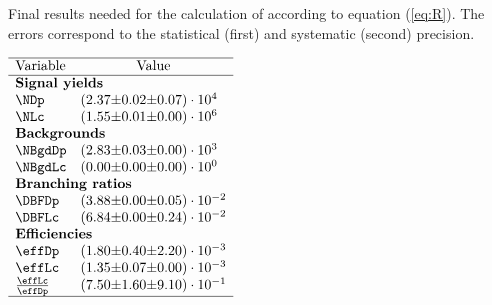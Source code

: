  
\begin{table}[h]
    \centering
    \caption{Final results needed for the calculation of \R according to equation (\ref{eq:R}). The errors correspond to the statistical (first) and systematic (second) precision.}
    \label{tab:table_finalresults.tex}
    $\begin{array}{lr@{\pm}r@{\pm}l}
    \hline
    \text{Variable} & \multicolumn{3}{c}{\text{Value}} \\
    \hline
\multicolumn{4}{l}{\text{\textbf{Signal yields}}} \\
\NDp&(2.37 & 0.02 & 0.07) \cdot 10^{4}\\
\NLc&(1.55 & 0.01 & 0.00) \cdot 10^{6}\\
\multicolumn{4}{l}{\text{\textbf{Backgrounds}}} \\
\NBgdDp&(2.83 & 0.03 & 0.00) \cdot 10^{3}\\
\NBgdLc&(0.00 & 0.00 & 0.00) \cdot 10^{0}\\
\multicolumn{4}{l}{\text{\textbf{Branching ratios}}} \\
\DBFDp&(3.88 & 0.00 & 0.05) \cdot 10^{-2}\\
\DBFLc&(6.84 & 0.00 & 0.24) \cdot 10^{-2}\\
\multicolumn{4}{l}{\text{\textbf{Efficiencies}}} \\
\effDp&(1.80 & 0.40 & 2.20) \cdot 10^{-3}\\
\effLc&(1.35 & 0.07 & 0.00) \cdot 10^{-3}\\
\frac{\effLc}{\effDp}&(7.50 & 1.60 & 9.10) \cdot 10^{-1}\\

    \hline
    \end{array}$
\end{table}
